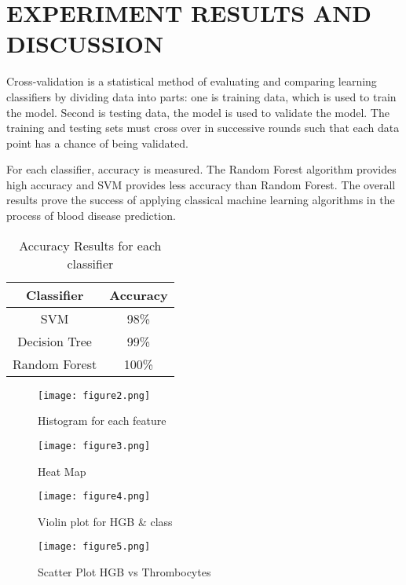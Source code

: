 \documentclass[twocolumn]{article}
\begin{document}
\section{EXPERIMENT RESULTS AND DISCUSSION}

Cross-validation is a statistical method of evaluating and comparing learning classifiers by dividing data into parts: one is training data, which is used to train the model. Second is testing data, the model is used to validate the model. The training and testing sets must cross over in successive rounds such that each data point has a chance of being validated.\cite{Michalski1990}

For each classifier, accuracy is measured. The Random Forest algorithm provides high accuracy and SVM provides less accuracy than Random Forest. The overall results prove the success of applying classical machine learning algorithms in the process of blood disease prediction.

\begin{table}[ht]
\centering
\begin{tabular}{|c|c|}
\hline
\textbf{Classifier} & \textbf{Accuracy} \\
\hline
SVM & 98\% \\
\hline
Decision Tree & 99\% \\
\hline
Random Forest & 100\% \\
\hline
\end{tabular}
\caption{Accuracy Results for each classifier}
\label{tab:example2}
\end{table}

\begin{figure}[ht]
\centering
\texttt{[image: figure2.png]}
\label{histogram}
\caption{Histogram for each feature}
\end{figure}
\vspace{2cm}
\begin{figure}[ht]
\centering
\texttt{[image: figure3.png]}
\label{heatmap}
\caption{Heat Map}
\end{figure}

\begin{figure}[ht]
\centering
\texttt{[image: figure4.png]}
\label{vplot}
\caption{Violin plot for HGB \& class}
\end{figure}
\pagebreak
\begin{figure}[ht]
\centering
\texttt{[image: figure5.png]}
\label{splot}
\caption{Scatter Plot HGB vs Thrombocytes}
\end{figure}
\end{document}
